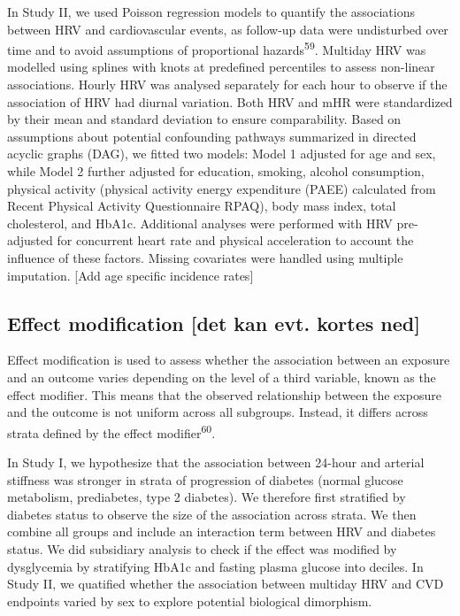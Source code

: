 \documentclass[
  a4paper,
  headsepline=true,
  open=any]{scrbook}
\begin{document}
In Study II, we used Poisson regression models to quantify the
associations between HRV and cardiovascular events, as follow-up data
were undisturbed over time and to avoid assumptions of proportional
hazards\textsuperscript{59}. Multiday HRV was modelled using splines
with knots at predefined percentiles to assess non-linear associations.
Hourly HRV was analysed separately for each hour to observe if the
association of HRV had diurnal variation. Both HRV and mHR were
standardized by their mean and standard deviation to ensure
comparability. Based on assumptions about potential confounding pathways
summarized in directed acyclic graphs (DAG), we fitted two models: Model
1 adjusted for age and sex, while Model 2 further adjusted for
education, smoking, alcohol consumption, physical activity (physical
activity energy expenditure (PAEE) calculated from Recent Physical
Activity Questionnaire RPAQ), body mass index, total cholesterol, and
HbA1c. Additional analyses were performed with HRV pre-adjusted for
concurrent heart rate and physical acceleration to account the influence
of these factors. Missing covariates were handled using multiple
imputation. {[}Add age specific incidence rates{]}

\hypertarget{effect-modification-det-kan-evt.-kortes-ned}{%
\subsection{Effect modification {[}det kan evt. kortes
ned{]}}\label{effect-modification-det-kan-evt.-kortes-ned}}

Effect modification is used to assess whether the association between an
exposure and an outcome varies depending on the level of a third
variable, known as the effect modifier. This means that the observed
relationship between the exposure and the outcome is not uniform across
all subgroups. Instead, it differs across strata defined by the effect
modifier\textsuperscript{60}.

In Study I, we hypothesize that the association between 24-hour and
arterial stiffness was stronger in strata of progression of diabetes
(normal glucose metabolism, prediabetes, type 2 diabetes). We therefore
first stratified by diabetes status to observe the size of the
association across strata. We then combine all groups and include an
interaction term between HRV and diabetes status. We did subsidiary
analysis to check if the effect was modified by dysglycemia by
stratifying HbA1c and fasting plasma glucose into deciles. In Study II,
we quatified whether the association between multiday HRV and CVD
endpoints varied by sex to explore potential biological dimorphism.
\end{document}
